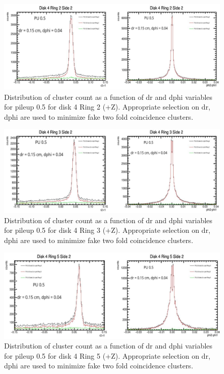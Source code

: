 \begin{figure}[!htp]
\centering
\includegraphics[width=1\textwidth]{ashish_thesis/D4R2_S2_drdphicut.png}
\caption{%
   Distribution of cluster count as a function of dr and dphi variables for pileup 0.5 for disk 4 Ring 2 (+Z). Appropriate selection on dr, dphi are used to minimize fake two fold coincidence clusters.
}
\label{fig:cluster_ring}
\end{figure}


\begin{figure}[!htp]
\centering
\includegraphics[width=1\textwidth]{ashish_thesis/D4R3_S2_drdphi_cut.png}
\caption{%
  Distribution of cluster count as a function of dr and dphi variables for pileup 0.5 for disk 4 Ring 3 (+Z). Appropriate selection on dr, dphi are used to minimize fake two fold coincidence clusters.
}
\label{fig:cluster_ring}
\end{figure}


\begin{figure}[!htp]
\centering
\includegraphics[width=1\textwidth]{ashish_thesis/D4R5_drdphicut.png}
\caption{%
  Distribution of cluster count as a function of dr and dphi variables for pileup 0.5 for disk 4 Ring 5 (+Z). Appropriate selection on dr, dphi are used to minimize fake two fold coincidence clusters.
}
\label{fig:cluster_ring}
\end{figure}


